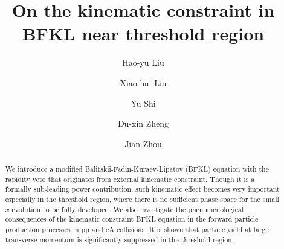 \documentclass[prd,aps,preprint,tightenlines,nofootinbib,superscriptaddress]{revtex4}
\begin{document}

\vspace*{2cm}
\title{On  the  kinematic constraint in BFKL near threshold region}


\author{Hao-yu  Liu}

\author{Xiao-hui Liu}


\author{Yu Shi}

\author{Du-xin Zheng}

\author{Jian Zhou}



\begin{abstract}
We introduce a modified Balitskii-Fadin-Kuraev-Lipatov (BFKL) equation with  the rapidity veto that originates from external kinematic constraint. Though it is a formally sub-leading power contribution, such kinematic effect becomes very important especially in the threshold region, where there is no sufficient phase space for the small $x$ evolution to be fully developed. We also investigate the phenomenological consequences of the kinematic constraint BFKL equation in the forward particle  production processes in pp and eA collisions.  It is shown that particle yield at large transverse momentum is significantly suppressed in the threshold region. 


\end{abstract}


\maketitle
\end{document}
